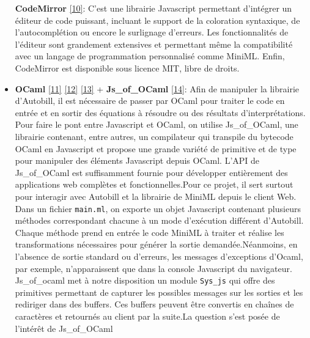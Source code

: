 \documentclass[12pt]{article}
\begin{document}
\begin{itemize}
        \textbf{CodeMirror} \protect\hyperlink{ref-codemirror}{{[}10{]}}:
        C'est une librairie Javascript permettant d'intégrer un éditeur de
        code puissant, incluant le support de la coloration syntaxique, de
        l'autocomplétion ou encore le surlignage d'erreurs. Les
        fonctionnalités de l'éditeur sont grandement extensives et permettant
        même la compatibilité avec un langage de programmation personnalisé
        comme MiniML. Enfin, CodeMirror est disponible sous licence MIT, libre
        de droits.
  \item
        \textbf{OCaml} \protect\hyperlink{ref-Minsky_Ocaml}{{[}11{]}}
        \protect\hyperlink{ref-chailloux}{{[}12{]}}
        \protect\hyperlink{ref-Leroy}{{[}13{]}} + \textbf{Js\_of\_OCaml}
        \protect\hyperlink{ref-js_of_ocaml}{{[}14{]}}: Afin de manipuler la
        librairie d'Autobill, il est nécessaire de passer par OCaml pour
        traiter le code en entrée et en sortir des équations à résoudre ou des
        résultats d'interprétations. Pour faire le pont entre Javascript et
        OCaml, on utilise Js\_of\_OCaml, une librairie contenant, entre
        autres, un compilateur qui transpile du bytecode OCaml en Javascript
        et propose une grande variété de primitive et de type pour manipuler
        des éléments Javascript depuis OCaml. L'API de Js\_of\_OCaml est
        suffisamment fournie pour développer entièrement des applications web
        complètes et fonctionnelles.\newline  Pour ce projet, il sert surtout
        pour interagir avec Autobill et la librairie de MiniML depuis le
        client Web. Dans un fichier \texttt{main.ml}, on exporte un objet
        Javascript contenant plusieurs méthodes correspondant chacune à un
        mode d'exécution différent d'Autobill. Chaque méthode prend en entrée
        le code MiniML à traiter et réalise les transformations nécessaires
        pour générer la sortie demandée.\newline  Néanmoins, en l'absence de
        sortie standard ou d'erreurs, les messages d'exceptions d'Ocaml, par
        exemple, n'apparaissent que dans la console Javascript du navigateur.
        Js\_of\_ocaml met à notre disposition un module \texttt{Sys\_js} qui
        offre des primitives permettant de capturer les possibles messages sur
        les sorties et les rediriger dans des buffers. Ces buffers peuvent
        être convertis en chaînes de caractères et retournés au client par la
        suite.\newline  La question s'est posée de l'intérêt de Js\_of\_OCaml

\end{itemize}
\end{document}
